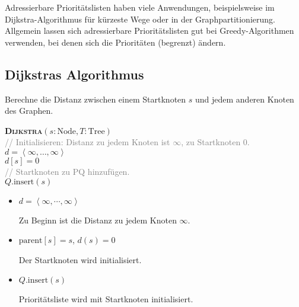 Adressierbare Prioritätslisten haben viele Anwendungen, beispielsweise im Dijkstra-Algorithmus für kürzeste Wege oder in der Graphpartitionierung. Allgemein lassen sich adressierbare Prioritätslisten gut bei Greedy-Algorithmen verwenden, bei denen sich die Prioritäten (begrenzt) ändern.

\subsection{Dijkstras Algorithmus}

Berechne die Distanz zwischen einem Startknoten \( s \) und jedem anderen Knoten des Graphen.

\begin{pseudocode}
  \textbf{\textsc{Dijkstra}}\( (s : \text{Node}, T : \text{Tree}) \) \\
  \textcolor{gray}{// Initialisieren: Distanz zu jedem Knoten ist \( \infty \), zu Startknoten \( 0 \).} \\
  \( d = \left\langle \infty,\ldots,\infty \right\rangle \) \\
  \( d[s] = 0 \) \\
  \textcolor{gray}{// Startknoten zu PQ hinzufügen.} \\
  \( Q\text{.insert}(s) \)
\end{pseudocode}

\begin{itemize}
  \item \( d = \left\langle \infty,\cdots,\infty \right\rangle \)
  
  Zu Beginn ist die Distanz zu jedem Knoten \( \infty \).

  \item \( \text{parent}[s] = s \), \( d(s) = 0 \)
  
  Der Startknoten wird initialisiert.

  \item \( Q\text{.insert}(s) \) 

  Prioritätsliste wird mit Startknoten initialisiert.
\end{itemize}